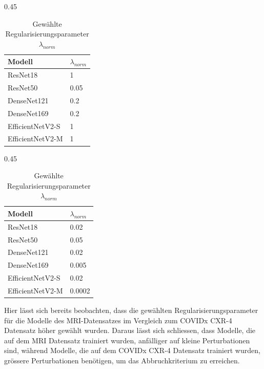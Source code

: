 \begin{table}[H]
    \centering
    \begin{subtable}{0.45\linewidth}
        \centering
        \begin{tabular}{l|l}
            \hline
            \textbf{Modell} & \textbf{$\lambda_{norm}$} \\ 
            \hline
            ResNet18 & 1 \\
            \hline
            ResNet50 & 0.05 \\
            \hline
            DenseNet121 & 0.2\\
            \hline
            DenseNet169 & 0.2 \\
            \hline
            EfficientNetV2-S & 1\\
            \hline
            EfficientNetV2-M & 1\\
        \end{tabular}
        \caption{$\lambda_{norm}$ für den MRI Datensatz}
        \label{tab:BrainTumor}
    \end{subtable}%
    \hspace{0.05\linewidth} %
    \begin{subtable}{0.45\linewidth}
        \centering
        \begin{tabular}{l|l}
            \hline
            \textbf{Modell} & \textbf{$\lambda_{norm}$} \\ 
            \hline
            ResNet18 & 0.02 \\
            \hline
            ResNet50 & 0.05 \\
            \hline
            DenseNet121 & 0.02\\
            \hline
            DenseNet169 & 0.005 \\
            \hline
            EfficientNetV2-S & 0.02\\
            \hline
            EfficientNetV2-M & 0.0002\\
        \end{tabular}
        \caption{$\lambda_{norm}$ für den COVIDx CXR-4 Datensatz}
        \label{tab:COVIDxCXR4}
    \end{subtable}
    \caption{Gewählte  Regularisierungsparameter $\lambda_{norm}$}
    \label{tab:Regularisierungsparameter}
\end{table}

Hier lässt sich bereits beobachten, dass die gewählten Regularisierungsparameter für die Modelle des MRI-Datensatzes im Vergleich zum COVIDx CXR-4 Datensatz höher gewählt wurden. Daraus lässt sich schliessen, dass Modelle, die auf dem MRI Datensatz trainiert wurden, anfälliger auf kleine Perturbationen sind, während Modelle, die auf dem COVIDx CXR-4 Datensatz trainiert wurden, grössere Perturbationen benötigen, um das Abbruchkriterium zu erreichen.

